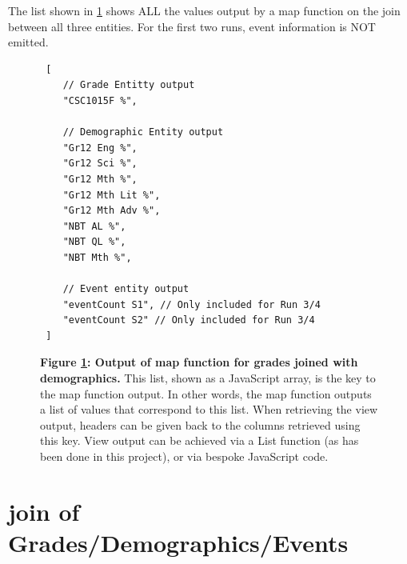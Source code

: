 The list shown in \ref{grades-join-demographics-output} shows ALL the values output by a map function on the join between all three entities. For the first two runs, event information is NOT emitted.

\begin{figure}[ht]
    \centering
    \begin{verbatim}
 [
    // Grade Entitty output
    "CSC1015F %",

    // Demographic Entity output
    "Gr12 Eng %", 
    "Gr12 Sci %",
    "Gr12 Mth %",
    "Gr12 Mth Lit %",
    "Gr12 Mth Adv %",
    "NBT AL %",
    "NBT QL %",
    "NBT Mth %",

    // Event entity output
    "eventCount S1", // Only included for Run 3/4
    "eventCount S2" // Only included for Run 3/4
 ]    
    \end{verbatim}
    \caption[2-way-join map output]{\textbf{Figure \ref{grades-join-demographics-output}: Output of map function for grades joined with demographics.} This list, shown as a JavaScript array, is the key to the map function output. In other words, the map function outputs a list of values that correspond to this list. When retrieving the view output, headers can be given back to the columns retrieved using this key. View output can be achieved via a List function (as has been done in this project), or via bespoke JavaScript code.}
    \label{grades-join-demographics-output}
\end{figure}



\section{join of Grades/Demographics/Events}


